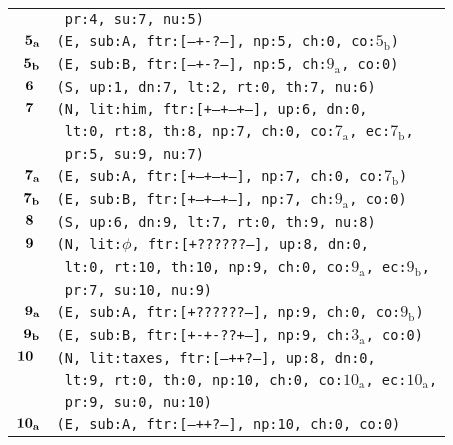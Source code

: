 \documentclass{article}
\begin{document}
\begin{minipage}{\textwidth}
{\begin{tabular}{|r|l|}
    & \texttt{\texttt{~pr:4,~su:7,~nu:5)}} \\
    ${\textbf{\textrm{5}}_{\textbf{\textrm{a}}}}$ & \texttt{\texttt{(E,~sub:A,~ftr:[---+-?---],~np:5,~ch:0,~co:${\textrm{5}_{\textrm{b}}}$)}} \\
    ${\textbf{\textrm{5}}_{\textbf{\textrm{b}}}}$ & \texttt{\texttt{(E,~sub:B,~ftr:[---+-?---],~np:5,~ch:${\textrm{9}_{\textrm{a}}}$,~co:0)}} \\
    ${\textbf{\textrm{6}}_{\phantom{z}}}$ & \texttt{\texttt{(S,~up:1,~dn:7,~lt:2,~rt:0,~th:7,~nu:6)}} \\
    ${\textbf{\textrm{7}}_{\phantom{z}}}$ & \texttt{\texttt{(N,~lit:him,~ftr:[+--+--+--],~up:6,~dn:0,}} \\
    & \texttt{\texttt{~lt:0,~rt:8,~th:8,~np:7,~ch:0,~co:${\textrm{7}_{\textrm{a}}}$,~ec:${\textrm{7}_{\textrm{b}}}$,}} \\
    & \texttt{\texttt{~pr:5,~su:9,~nu:7)}} \\
    ${\textbf{\textrm{7}}_{\textbf{\textrm{a}}}}$ & \texttt{\texttt{(E,~sub:A,~ftr:[+--+--+--],~np:7,~ch:0,~co:${\textrm{7}_{\textrm{b}}}$)}} \\
    ${\textbf{\textrm{7}}_{\textbf{\textrm{b}}}}$ & \texttt{\texttt{(E,~sub:B,~ftr:[+--+--+--],~np:7,~ch:${\textrm{9}_{\textrm{a}}}$,~co:0)}} \\
    ${\textbf{\textrm{8}}_{\phantom{z}}}$ & \texttt{\texttt{(S,~up:6,~dn:9,~lt:7,~rt:0,~th:9,~nu:8)}} \\
    ${\textbf{\textrm{9}}_{\phantom{z}}}$ & \texttt{\texttt{(N,~lit:$\phi$,~ftr:[+??????--],~up:8,~dn:0,}} \\
    & \texttt{\texttt{~lt:0,~rt:10,~th:10,~np:9,~ch:0,~co:${\textrm{9}_{\textrm{a}}}$,~ec:${\textrm{9}_{\textrm{b}}}$,}} \\
    & \texttt{\texttt{~pr:7,~su:10,~nu:9)}} \\
    ${\textbf{\textrm{9}}_{\textbf{\textrm{a}}}}$ & \texttt{\texttt{(E,~sub:A,~ftr:[+??????--],~np:9,~ch:0,~co:${\textrm{9}_{\textrm{b}}}$)}} \\
    ${\textbf{\textrm{9}}_{\textbf{\textrm{b}}}}$ & \texttt{\texttt{(E,~sub:B,~ftr:[+-+-??+--],~np:9,~ch:${\textrm{3}_{\textrm{a}}}$,~co:0)}} \\
    ${\textbf{\textrm{10}}_{\phantom{z}}}$ & \texttt{\texttt{(N,~lit:taxes,~ftr:[---++?---],~up:8,~dn:0,}} \\
    & \texttt{\texttt{~lt:9,~rt:0,~th:0,~np:10,~ch:0,~co:${\textrm{10}_{\textrm{a}}}$,~ec:${\textrm{10}_{\textrm{a}}}$,}} \\
    & \texttt{\texttt{~pr:9,~su:0,~nu:10)}} \\
    ${\textbf{\textrm{10}}_{\textbf{\textrm{a}}}}$ & \texttt{\texttt{(E,~sub:A,~ftr:[---++?---],~np:10,~ch:0,~co:0)}} \\
    \hline
  \end{tabular}
  }
\end{minipage}
\bigbreak
\end{document}
